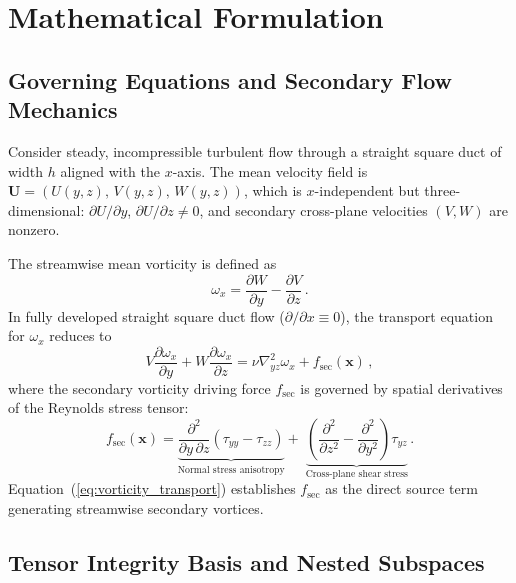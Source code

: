 \documentclass[preprint,aps,prb,longbibliography,superscriptaddress]{revtex4-2}
\newcommand{\bx}{\mathbf{x}}
\newcommand{\bU}{\mathbf{U}}
\newcommand{\fsec}{f_{\text{sec}}}
\begin{document}
\section{Mathematical Formulation}\label{sec:math}

\subsection{Governing Equations and Secondary Flow Mechanics}
\label{sec:governing}

Consider steady, incompressible turbulent flow through a straight square duct
of width $h$ aligned with the $x$-axis. The mean velocity field is
$\bU = (U(y,z),\, V(y,z),\, W(y,z))$, which is $x$-independent but
three-dimensional: $\partial U/\partial y$, $\partial U/\partial z \neq 0$,
and secondary cross-plane velocities $(V,W)$ are nonzero.

The streamwise mean vorticity is defined as
\begin{equation}\label{eq:vorticity}
  \omega_x = \frac{\partial W}{\partial y} - \frac{\partial V}{\partial z}\,.
\end{equation}
In fully developed straight square duct flow ($\partial/\partial x \equiv 0$), the transport equation for $\omega_x$
reduces to
\begin{equation}\label{eq:vorticity_transport}
  V\frac{\partial \omega_x}{\partial y}
  + W\frac{\partial \omega_x}{\partial z}
  = \nu \nabla_{yz}^2 \omega_x + \fsec(\bx)\,,
\end{equation}
where the secondary vorticity driving force $\fsec$ is governed by spatial
derivatives of the Reynolds stress tensor:
\begin{equation}\label{eq:fsec}
  \fsec(\bx) =
  \underbrace{\frac{\partial^2}{\partial y\,\partial z}
    (\tau_{yy} - \tau_{zz})}_{\text{Normal stress anisotropy}}
  +\;
  \underbrace{\left(\frac{\partial^2}{\partial z^2}
    - \frac{\partial^2}{\partial y^2}\right)\tau_{yz}}_{\text{Cross-plane shear stress}}\,.
\end{equation}
Equation~(\ref{eq:vorticity_transport}) establishes $\fsec$ as the direct
source term generating streamwise secondary vortices.

\subsection{Tensor Integrity Basis and Nested Subspaces}
\label{sec:basis}
\end{document}

